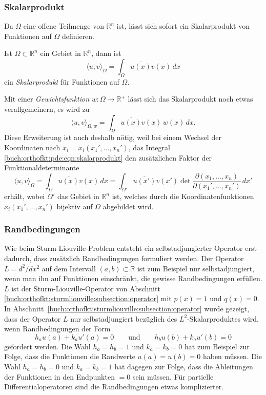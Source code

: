 %
%
\subsubsection{Skalarprodukt}
Da $\Omega$ eine offene Teilmenge von $\mathbb{R}^n$ ist, lässt sich
sofort ein Skalarprodukt von Funktionen auf $\Omega$ definieren.

\begin{definition}[Skalarprodukt]
Ist $\Omega\subset \mathbb{R}^n$ ein Gebiet in $\mathbb{R}^n$, dann ist
\begin{equation}
\langle u,v\rangle_\Omega
=
\int_{\Omega}  \overline{u(x)} v(x)\,dx
\label{buch:orthofkt:pde:eqn:skalarprodukt}
\end{equation}
ein {\em Skalarprodukt} für Funktionen auf $\Omega$.
\end{definition}

Mit einer {\em Gewichtsfunktion} $w\colon \Omega \to \mathbb{R}^+$ lässt sich
%
das Skalarprodukt noch etwas verallgemeinern, es wird zu
\[
\langle u,v\rangle_{\Omega,w}
=
\int_{\Omega} \overline{u(x)}v(x)\,w(x)\,dx.
\]
Diese Erweiterung ist auch deshalb nötig, weil bei einem Wechsel
der Koordinaten nach $x_i=x_i(x_1',\dots,x_n')$, das Integral
\eqref{buch:orthofkt:pde:eqn:skalarprodukt}
den zusätzlichen Faktor der Funktionaldeterminante 
%
\[
\langle u,v\rangle_{\Omega}
=
\int_{\Omega} \overline{u(x)} v(x)\,dx 
=
\int_{\Omega'} \overline{u(x')} v(x')
\det\frac{\partial(x_1,\dots,x_n)}{\partial(x_1',\dots,x_n')}
\,dx'
\]
erhält, wobei $\Omega'$ das Gebiet in $\mathbb{R}^n$ ist, welches
durch die Koordinatenfunktionen $x_i(x_1',\dots,x_n')$ bijektiv auf
$\Omega$ abgebildet wird.


%
%
\subsubsection{Randbedingungen}
Wie beim Sturm-Liouville-Problem entsteht ein selbstadjungierter Operator
erst dadurch, dass zusätzlich Randbedingungen formuliert werden.
Der Operator $L=d^2/dx^2$ auf dem Intervall $(a,b)\subset\mathbb{R}$
ist zum Beispiel nur selbstadjungiert, wenn man ihn auf Funktionen
einschränkt, die gewisse Randbedingungen erfüllen.
$L$ ist der Sturm-Liouville-Operator von Abschnitt
\ref{buch:orthofkt:sturmliouville:subsection:operator}
mit $p(x)=1$ und $q(x)=0$.
In Abschnitt~\ref{buch:orthofkt:sturmliouville:subsection:operator}
wurde gezeigt, dass der Operator $L$ nur selbstadjungiert bezüglich
des $L^2$-Skalarproduktes wird, wenn Randbedingungen der Form
\begin{equation}
h_a u(a) + k_a u'(a) =  0
\qquad\text{und}\qquad
h_b u(b) + k_a u'(b) =  0
\end{equation}
gefordert werden.
Die Wahl $h_a=h_b=1$ und $k_a=k_b=0$ hat zum Beispiel zur Folge,
dass die Funktionen die Randwerte $u(a)=u(b)=0$ haben müssen.
Die Wahl $h_a=h_b=0$ und $k_a=k_b=1$ hat dagegen zur Folge,
dass die Ableitungen der Funktionen in den Endpunkten $=0$ sein
müssen.
Für partielle Differentialoperatoren sind die Randbedingungen
etwas komplizierter.

